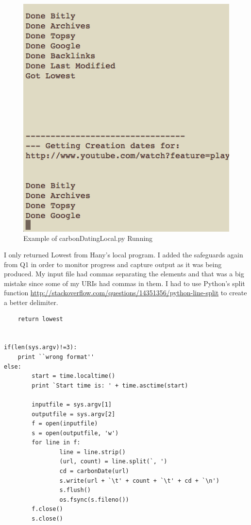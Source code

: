 \documentclass{article}
\begin{document}
\begin{figure}[H]
\centering
\includegraphics[scale=0.50]{q3/carbonDateRunning}
\caption{Example of carbonDatingLocal.py Running}
\label{hangup}
\end{figure}

I only returned Lowest from Hany's local program. I added the safeguards again from Q1 in order to monitor progress and capture output as it was being produced. My input file had commas separating the elements and that was a big mistake since some of my URIs had commas in them. I had to use Python's split function \url{http://stackoverflow.com/questions/14351356/python-line-split} to create a better delimiter.

\begin{lstlisting}
	return lowest
   

if(len(sys.argv)!=3):
	print ``wrong format''
else:
        start = time.localtime()
        print `Start time is: ' + time.asctime(start)
        
        inputfile = sys.argv[1]
        outputfile = sys.argv[2]
        f = open(inputfile)
        s = open(outputfile, 'w')
        for line in f:
                line = line.strip()
                (url, count) = line.split(`, ')
                cd = carbonDate(url)
                s.write(url + `\t' + count + `\t' + cd + `\n')
                s.flush()
                os.fsync(s.fileno())
        f.close()
        s.close()

\end{lstlisting}
\end{document}
